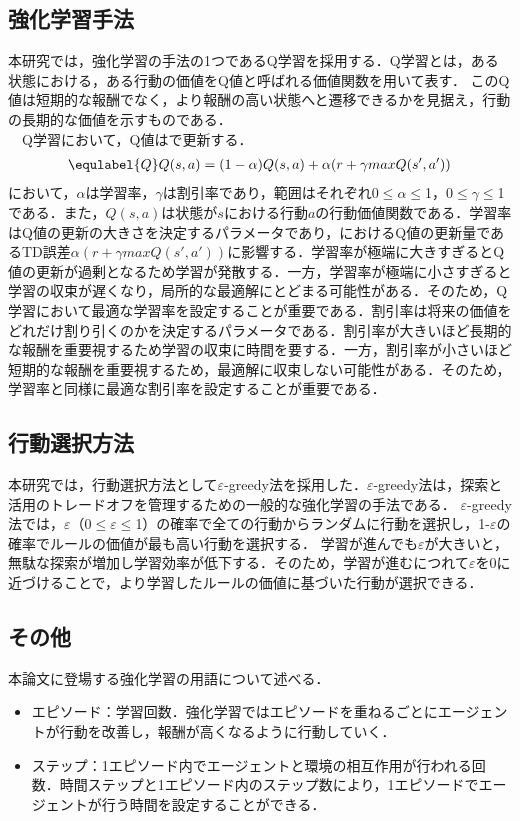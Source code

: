 \subsection{強化学習手法}
本研究では，強化学習の手法の1つであるQ学習\cite{watkins}を採用する．Q学習とは，ある状態における，ある行動の価値をQ値と呼ばれる価値関数を用いて表す．
このQ値は短期的な報酬でなく，より報酬の高い状態へと遷移できるかを見据え，行動の長期的な価値を示すものである．\\
　Q学習において，Q値はで更新する．\\
\begin{eqnarray}
  \equlabel{Q}
  Q(s,a)=(1-\alpha)Q(s,a)+\alpha(r+\gamma maxQ(s',a'))
\end{eqnarray}
において，$\alpha$は学習率，$\gamma$は割引率であり，範囲はそれぞれ0$\leq$$\alpha$$\leq$1，0$\leq$$\gamma$$\leq$1である．また，$Q(s,a)$は状態が$s$における行動$a$の行動価値関数である．学習率はQ値の更新の大きさを決定するパラメータであり，におけるQ値の更新量であるTD誤差$\alpha(r+\gamma maxQ(s',a'))$に影響する．学習率が極端に大きすぎるとQ値の更新が過剰となるため学習が発散する．一方，学習率が極端に小さすぎると学習の収束が遅くなり，局所的な最適解にとどまる可能性がある．そのため，Q学習において最適な学習率を設定することが重要である．割引率は将来の価値をどれだけ割り引くのかを決定するパラメータである．割引率が大きいほど長期的な報酬を重要視するため学習の収束に時間を要する．一方，割引率が小さいほど短期的な報酬を重要視するため，最適解に収束しない可能性がある．そのため，学習率と同様に最適な割引率を設定することが重要である．
\subsection{行動選択方法}
本研究では，行動選択方法として$\varepsilon$-greedy法\cite{greedy}を採用した．$\varepsilon$-greedy法は，探索と活用のトレードオフを管理するための一般的な強化学習の手法である．
$\varepsilon$-greedy法では，$\varepsilon$（0$\leq$$\varepsilon$$\leq$1）の確率で全ての行動からランダムに行動を選択し，1-$\varepsilon$の確率でルールの価値が最も高い行動を選択する．
学習が進んでも$\varepsilon$が大きいと，無駄な探索が増加し学習効率が低下する．そのため，学習が進むにつれて$\varepsilon$を0に近づけることで，より学習したルールの価値に基づいた行動が選択できる．
\subsection{その他}
本論文に登場する強化学習の用語について述べる．\\
\begin{itemize}
  \item エピソード：学習回数．強化学習ではエピソードを重ねるごとにエージェントが行動を改善し，報酬が高くなるように行動していく．
  \item ステップ：1エピソード内でエージェントと環境の相互作用が行われる回数．時間ステップと1エピソード内のステップ数により，1エピソードでエージェントが行う時間を設定することができる．
\end{itemize}
